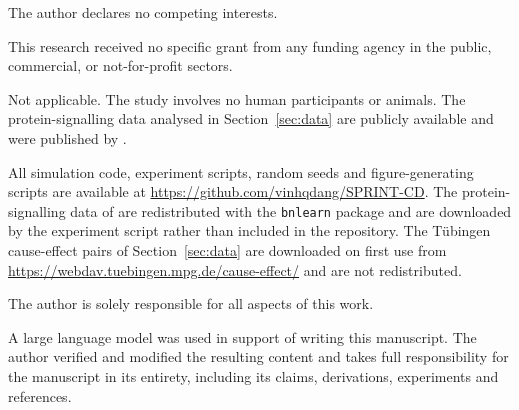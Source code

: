
 The author declares no competing interests.

 This research received no specific grant from any funding
agency in the public, commercial, or not-for-profit sectors.

 Not applicable. The study involves no human
participants or animals. The protein-signalling data analysed in
Section~\ref{sec:data} are publicly available and were published by
\citet{sachs2005causal}.

 All simulation code, experiment scripts,
random seeds and figure-generating scripts are available at
\url{https://github.com/vinhqdang/SPRINT-CD}. The protein-signalling data of
\citet{sachs2005causal} are redistributed with the \texttt{bnlearn} package
\citep{scutari2010learning} and are downloaded by the experiment script rather
than included in the repository. The Tübingen cause-effect pairs of
Section~\ref{sec:data} are downloaded on first use from
\url{https://webdav.tuebingen.mpg.de/cause-effect/} and are not redistributed.

 The author is solely responsible for all aspects
of this work.

 A large language model was used in support of
writing this manuscript. The author verified and modified the resulting
content and takes full responsibility for the manuscript in its entirety,
including its claims, derivations, experiments and references.
